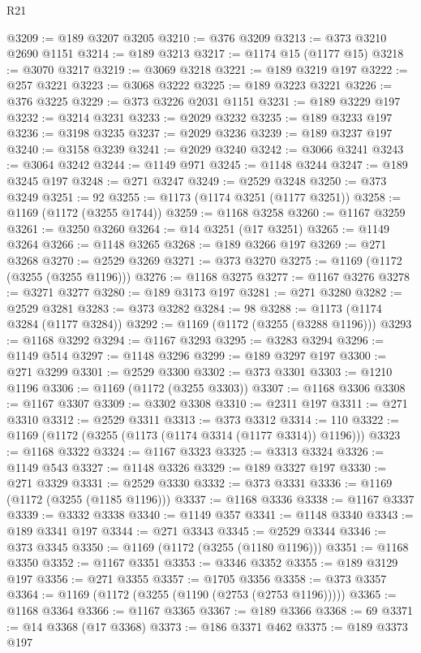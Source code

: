 \begin{lexlean}{R21}
\begin{coremodule}
@3209 := @189 @3207 @3205
@3210 := @376 @3209
@3213 := @373 @3210 @2690 @1151
@3214 := @189 @3213
@3217 := @1174 @15 (@1177 @15)
@3218 := @3070 @3217
@3219 := @3069 @3218
@3221 := @189 @3219 @197
@3222 := @257 @3221
@3223 := @3068 @3222
@3225 := @189 @3223 @3221
@3226 := @376 @3225
@3229 := @373 @3226 @2031 @1151
@3231 := @189 @3229 @197
@3232 := @3214 @3231
@3233 := @2029 @3232
@3235 := @189 @3233 @197
@3236 := @3198 @3235
@3237 := @2029 @3236
@3239 := @189 @3237 @197
@3240 := @3158 @3239
@3241 := @2029 @3240
@3242 := @3066 @3241
@3243 := @3064 @3242
@3244 := @1149 @971
@3245 := @1148 @3244
@3247 := @189 @3245 @197
@3248 := @271 @3247
@3249 := @2529 @3248
@3250 := @373 @3249
@3251 := 92
@3255 := @1173 (@1174 @3251 (@1177 @3251))
@3258 := @1169 (@1172 (@3255 @1744))
@3259 := @1168 @3258
@3260 := @1167 @3259
@3261 := @3250 @3260
@3264 := @14 @3251 (@17 @3251)
@3265 := @1149 @3264
@3266 := @1148 @3265
@3268 := @189 @3266 @197
@3269 := @271 @3268
@3270 := @2529 @3269
@3271 := @373 @3270
@3275 := @1169 (@1172 (@3255 (@3255 @1196)))
@3276 := @1168 @3275
@3277 := @1167 @3276
@3278 := @3271 @3277
@3280 := @189 @3173 @197
@3281 := @271 @3280
@3282 := @2529 @3281
@3283 := @373 @3282
@3284 := 98
@3288 := @1173 (@1174 @3284 (@1177 @3284))
@3292 := @1169 (@1172 (@3255 (@3288 @1196)))
@3293 := @1168 @3292
@3294 := @1167 @3293
@3295 := @3283 @3294
@3296 := @1149 @514
@3297 := @1148 @3296
@3299 := @189 @3297 @197
@3300 := @271 @3299
@3301 := @2529 @3300
@3302 := @373 @3301
@3303 := @1210 @1196
@3306 := @1169 (@1172 (@3255 @3303))
@3307 := @1168 @3306
@3308 := @1167 @3307
@3309 := @3302 @3308
@3310 := @2311 @197
@3311 := @271 @3310
@3312 := @2529 @3311
@3313 := @373 @3312
@3314 := 110
@3322 := @1169 (@1172 (@3255 (@1173 (@1174 @3314 (@1177 @3314)) @1196)))
@3323 := @1168 @3322
@3324 := @1167 @3323
@3325 := @3313 @3324
@3326 := @1149 @543
@3327 := @1148 @3326
@3329 := @189 @3327 @197
@3330 := @271 @3329
@3331 := @2529 @3330
@3332 := @373 @3331
@3336 := @1169 (@1172 (@3255 (@1185 @1196)))
@3337 := @1168 @3336
@3338 := @1167 @3337
@3339 := @3332 @3338
@3340 := @1149 @357
@3341 := @1148 @3340
@3343 := @189 @3341 @197
@3344 := @271 @3343
@3345 := @2529 @3344
@3346 := @373 @3345
@3350 := @1169 (@1172 (@3255 (@1180 @1196)))
@3351 := @1168 @3350
@3352 := @1167 @3351
@3353 := @3346 @3352
@3355 := @189 @3129 @197
@3356 := @271 @3355
@3357 := @1705 @3356
@3358 := @373 @3357
@3364 := @1169 (@1172 (@3255 (@1190 (@2753 (@2753 @1196)))))
@3365 := @1168 @3364
@3366 := @1167 @3365
@3367 := @189 @3366
@3368 := 69
@3371 := @14 @3368 (@17 @3368)
@3373 := @186 @3371 @462
@3375 := @189 @3373 @197

\end{coremodule}
\end{lexlean}
